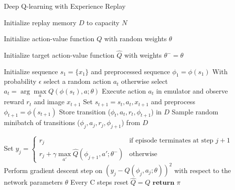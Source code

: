 \documentclass[11pt]{article}
\begin{document}
\begin{algorithm}[H]
\caption{Deep Q-learning with Experience Replay}
\label{algo:dql}
\begin{algorithmic}[1]
\vspace{0.15cm}
\STATE Initialize replay memory $D$ to capacity $N$
\vspace{0.15cm}

\STATE Initialize action-value function $Q$ with random weights $\theta$
\vspace{0.15cm}

\STATE Initialize target action-value function $\hat{Q}$ with weights $\theta^{-} = \theta$
\vspace{0.15cm}

\vspace{0.15cm}
\STATE Initialize sequence $s_1 = \{x_1 \}$ and preprocessed sequence $\phi_1 = \phi(s_1)$
\vspace{0.15cm}
\vspace{0.15cm}
\STATE With probability $\epsilon$ select a random action $a_t$ otherwise select $a_t = \arg \max\limits_a Q(\phi(s_t), a; \theta)$
\vspace{0.15cm}
\STATE Execute action $a_t$ in emulator and observe reward $r_t$ and image $x_{t+1}$
\vspace{0.15cm}
\STATE Set $s_{t+1} = s_t, a_t, x_{t+1}$ and preprocess $\phi_{t+1} = \phi(s_{t+1})$
\vspace{0.15cm}
\STATE Store transition ($\phi_t, a_t, r_t, \phi_{t+1}$) in $D$
\vspace{0.15cm}
\STATE Sample random minibatch of transitions ($\phi_j, a_j, r_j, \phi_{j+1}$) from $D$
\vspace{0.15cm}

\STATE Set $y_j = \begin{cases}
r_j & \text{if episode terminates at step $j+1$}\\
r_j + \gamma \max\limits_{a'} \hat{Q}(\phi_{j+1}, a'; \theta^{-}) & \text{otherwise}
 \end{cases}$
\vspace{0.15cm}
\STATE Perform gradient descent step on $\left(y_j - Q(\phi_j, a_j; \theta)\right)^2$ with respect to the network parameters $\theta$
\vspace{0.15cm}
\STATE Every C steps reset $\hat{Q} = Q$
\vspace{0.15cm}
\ENDFOR
\vspace{0.15cm}
\ENDFOR
\vspace{0.15cm}
\STATE $\textbf{return } \pi$
\end{algorithmic}
\end{algorithm}
\end{document}
